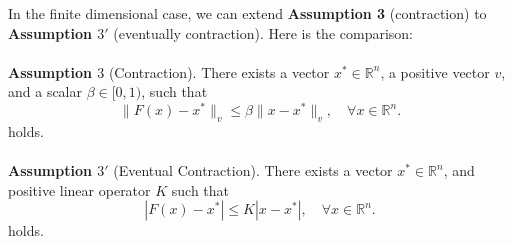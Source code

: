 In the finite dimensional case, we can extend \textbf{Assumption 3} (contraction) to \textbf{Assumption $3'$} (eventually contraction). Here is the comparison: \\
\\
\textbf{Assumption $3$} (Contraction).
There exists a vector $x^* \in \mathbb{R}^n$, a positive vector $v$, and a scalar $\beta \in [0,1)$, such that
\begin{equation}
\|F(x) - x^*\|_v \leq \beta \|x - x^*\|_v, \quad \forall x \in \mathbb{R}^n.
\end{equation} holds.\\
\\
\textbf{Assumption $3'$}  (Eventual Contraction).
There exists a vector $x^* \in \mathbb{R}^n$, and positive linear operator $K$ such that
\begin{equation}
|F(x) - x^*| \leq K |x - x^*|, \quad \forall x \in \mathbb{R}^n.
\end{equation} holds.\\
\\
